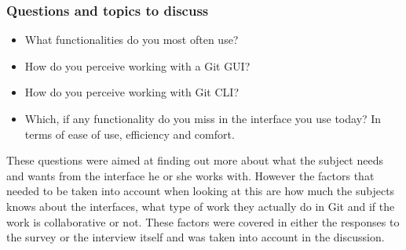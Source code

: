 \documentclass[a4paper,oneside]{bth} %
\begin{document}
					\subsubsection*{Questions and topics to discuss}
						\begin{itemize}
							\item What functionalities do you most often use?
							\item How do you perceive working with a Git GUI?
							\item How do you perceive working with Git CLI?
							\item Which, if any functionality do you miss in the interface you use today? In terms of ease of use, efficiency and comfort.
						\end{itemize}
						
						These questions were aimed at finding out more about what the subject needs and wants from the interface he or she works with. However the factors that needed to be taken into account when looking at this are how much the subjects knows about the interfaces, what type of work they actually do in Git and if the work is collaborative or not. These factors were covered in either the responses to the survey or the interview itself and was taken into account in the discussion.
\end{document}

